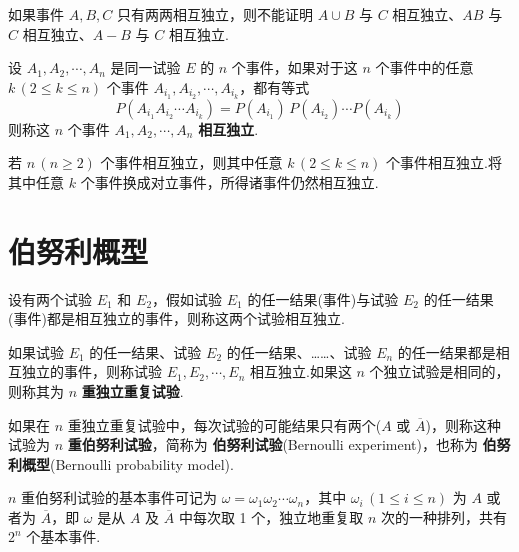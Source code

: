 \begin{note}
    \indent 如果事件 $A,B,C$ 只有两两相互独立，则不能证明 $A \cup B$ 与 $C$ 相互独立、$AB$ 与 $C$ 相互独立、$A-B$ 与 $C$ 相互独立.
\end{note}

\begin{definition}
    \indent 设 $A_1,A_2,\cdots,A_n$ 是同一试验 $E$ 的 $n$ 个事件，如果对于这 $n$ 个事件中的任意 $k\,(2\leqslant k\leqslant n)$ 个事件 $A_{i_1},A_{i_2},\cdots,A_{i_k}$，都有等式
    $$
    P(A_{i_1} A_{i_2} \cdots A_{i_k}) = P(A_{i_1}) \, P(A_{i_2}) \cdots P(A_{i_k})
    $$
    则称这 $n$ 个事件 $A_1,A_2,\cdots,A_n$ \textbf{相互独立}.
\end{definition}

\begin{conclusion}
    \indent 若 $n\, (n \geqslant 2)$ 个事件相互独立，则其中任意 $k\, (2 \leqslant k \leqslant n)$ 个事件相互独立.将其中任意 $k$ 个事件换成对立事件，所得诸事件仍然相互独立.
\end{conclusion}

\section{伯努利概型}

\begin{definition}
    \indent 设有两个试验 $E_1$ 和 $E_2$，假如试验 $E_1$ 的任一结果(事件)与试验 $E_2$ 的任一结果(事件)都是相互独立的事件，则称这两个试验相互独立.
\end{definition}

\begin{definition}
    \indent 如果试验 $E_1$ 的任一结果、试验 $E_2$ 的任一结果、……、试验 $E_n$ 的任一结果都是相互独立的事件，则称试验 $E_1, E_2, \cdots, E_n$ 相互独立.如果这 $n$ 个独立试验是相同的，则称其为 $n$ \textbf{重独立重复试验}.
\end{definition}

\begin{definition}
    \indent 如果在 $n$ 重独立重复试验中，每次试验的可能结果只有两个($A$ 或 $\overline{A}$)，则称这种试验为 $n$ \textbf{重伯努利试验}，简称为 \textbf{伯努利试验}(Bernoulli experiment)，也称为 \textbf{伯努利概型}(Bernoulli probability model).
\end{definition}

$n$ 重伯努利试验的基本事件可记为 $\omega=\omega_1 \omega_2 \cdots \omega_n$，其中 $\omega_i\,(1\leqslant i\leqslant n)$ 为 $A$ 或者为 $\overline{A}$，即 $\omega$ 是从 $A$ 及 $\overline{A}$ 中每次取 1 个，独立地重复取 $n$ 次的一种排列，共有 $2^n$ 个基本事件.

